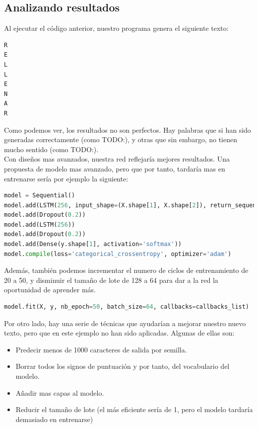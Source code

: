\subsection{Analizando resultados}
Al ejecutar el código anterior, nuestro programa genera el siguiente texto:
\begin{verbatim}
R
E
L
L
E
N
A
R
\end{verbatim}
Como podemos ver, los resultados no son perfectos. Hay palabras que si han sido generadas correctamente (como TODO:), y otras que sin embargo, no tienen mucho sentido (como TODO:).\\
Con diseños mas avanzados, nuestra red reflejaría mejores resultados. Una propuesta de modelo mas avanzado, pero que por tanto, tardaría mas en entrenarse sería por ejemplo la siguiente:
\begin{lstlisting}[language=Python]
model = Sequential()
model.add(LSTM(256, input_shape=(X.shape[1], X.shape[2]), return_sequences=True))
model.add(Dropout(0.2))
model.add(LSTM(256))
model.add(Dropout(0.2))
model.add(Dense(y.shape[1], activation='softmax'))
model.compile(loss='categorical_crossentropy', optimizer='adam')
\end{lstlisting}
Además, también podemos incrementar el numero de ciclos de entrenamiento de 20 a 50, y disminuir el tamaño de lote de 128 a 64 para dar a la red la oportunidad de aprender más.
\begin{lstlisting}[language=Python]
model.fit(X, y, nb_epoch=50, batch_size=64, callbacks=callbacks_list)
\end{lstlisting}
Por otro lado, hay una serie de técnicas que ayudarían a mejorar nuestro nuevo texto, pero que en este ejemplo no han sido aplicadas. Algunas de ellas son:
\begin{itemize}[noitemsep]
\item Predecir menos de 1000 caracteres de salida por semilla.
\item Borrar todos los signos de puntuación y por tanto, del vocabulario del modelo.
\item Añadir mas capas al modelo.
\item Reducir el tamaño de lote (el más eficiente sería de 1, pero el modelo tardaría demasiado en entrenarse)
\end{itemize}
